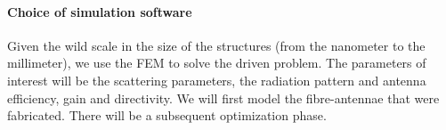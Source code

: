 \paragraph{Choice of simulation software}
Given the wild scale in the size of the structures (from the nanometer to the millimeter), we use
the FEM to solve the driven problem. The parameters of interest will be the scattering parameters, the
radiation pattern and antenna efficiency, gain and directivity. We will first model the fibre-antennae
that were fabricated. There will be a subsequent optimization phase.




